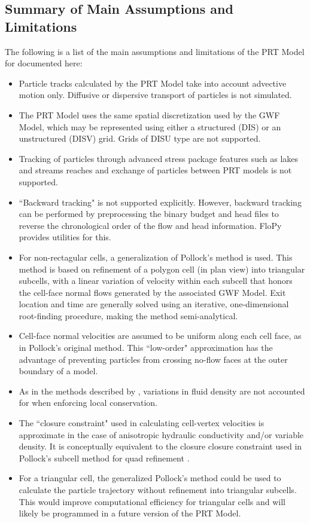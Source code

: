 \subsection{Summary of Main Assumptions and Limitations}

The following is a list of the main assumptions and limitations of the PRT Model for \mf documented here:

\begin{itemize}
\item Particle tracks calculated by the PRT Model take into account advective motion only. Diffusive or dispersive transport of particles is not simulated.
\item The PRT Model uses the same spatial discretization used by the GWF Model, which may be represented using either a structured (DIS) or an unstructured (DISV) grid. Grids of DISU type are not supported.
\item Tracking of particles through advanced stress package features such as lakes and streams reaches and exchange of particles between PRT models is not supported.
\item ``Backward tracking" is not supported explicitly. However, backward tracking can be performed by preprocessing the binary budget and head files to reverse the chronological order of the flow and head information. FloPy \citep{bakker2016flopy, hughes2023flopy, flopysoftware} provides utilities for this.
\item For non-rectagular cells, a generalization of Pollock's method is used. This method is based on refinement of a polygon cell (in plan view) into triangular subcells, with a linear variation of velocity within each subcell that honors the cell-face normal flows generated by the associated GWF Model. Exit location and time are generally solved using an iterative, one-dimensional root-finding procedure, making the method semi-analytical.
\item Cell-face normal velocities are assumed to be uniform along each cell face, as in Pollock's original method. This ``low-order" approximation has the advantage of preventing particles from crossing no-flow faces at the outer boundary of a model.
\item As in the methods described by \cite{zheng2012}, variations in fluid density are not accounted for when enforcing local conservation.
\item The ``closure constraint" used in calculating cell-vertex velocities is approximate in the case of anisotropic hydraulic conductivity and/or variable density. It is conceptually equivalent to the closure closure constraint used in Pollock's subcell method for quad refinement \citep{pollock2015}.
\item For a triangular cell, the generalized Pollock's method could be used to calculate the particle trajectory without refinement into triangular subcells. This would improve computational efficiency for triangular cells and will likely be programmed in a future version of the PRT Model.
\end{itemize}
